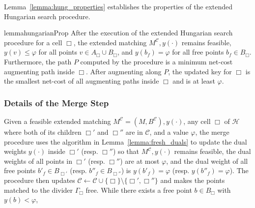 \documentclass[11pt,onecolumn]{article}
\def\mcC{{\mathcal{C}}}
\def\mcH{{\mathcal{H}}}
\newcommand{\cell}{\Box}
\newcommand{\ymax}{\varphi}
\begin{document}
Lemma~\ref{lemma:hung_properties} establishes the properties of the extended Hungarian search procedure.
\begin{restatable}{lemma}{hungarianProp}\label{lemma:hung_properties}\label{lemma:Hungarian_path}
After the execution of the extended Hungarian search procedure for a cell $\cell$, the extended matching $M^\mcC, y(\cdot)$ remains feasible, $y(v)\le \ymax$ for all points $v \in A_{\cell}\cup B_{\cell}$, and $y(b_f)=\ymax$ for all free points $b_f\in B_\cell$. Furthermore, the path $P$ computed by the procedure is a minimum net-cost augmenting path inside $\cell$. After augmenting along $P$, the updated key for $\cell$ is the smallest net-cost of all augmenting paths inside $\cell$ and is at least $\ymax$.
\end{restatable}


\subsubsection{Details of the Merge Step}\label{subsubsec:local} 
Given a feasible extended matching $M^\mcC=(M, B^\mcC), y(\cdot)$, any cell $\cell$ of $\mcH$ where both of its children $\cell'$ and $\cell''$ are in $\mcC$, and a value $\ymax$, the merge procedure uses the algorithm in Lemma~\ref{lemma:fresh_duals} to update the dual weights $y(\cdot)$ inside $\cell'$ (resp. $\cell''$)  so that $M^\mcC, y(\cdot)$ remains feasible, the dual weights of all points in $\cell'$ (resp. $\cell''$) are at most $\ymax$, and the dual weight of all free points $b'_f\in B_{\cell'}$ (resp. $b''_f\in B_{\cell''}$) is $y(b'_f)=\ymax$ (resp. $y(b''_f)=\ymax$). The procedure then updates $\mcC\leftarrow \mcC\cup \{\cell\}\setminus\{\cell', \cell''\}$ and makes the points matched to the divider $\Gamma_\cell$ free.  
While there exists a free point $b\in B_\cell$ with $y(b)<\ymax$,
\end{document}
